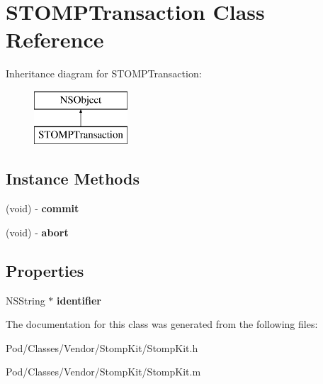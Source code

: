 \hypertarget{interface_s_t_o_m_p_transaction}{}\section{S\+T\+O\+M\+P\+Transaction Class Reference}
\label{interface_s_t_o_m_p_transaction}
Inheritance diagram for S\+T\+O\+M\+P\+Transaction\+:\begin{figure}[H]
\begin{center}
\leavevmode
\includegraphics[height=2.000000cm]{interface_s_t_o_m_p_transaction}
\end{center}
\end{figure}
\subsection*{Instance Methods}
\begin{DoxyCompactItemize}
\item 
(void) -\/ {\bfseries commit}\hypertarget{interface_s_t_o_m_p_transaction_af8bf085f7fa43b16c21efb34211fb363}{}\label{interface_s_t_o_m_p_transaction_af8bf085f7fa43b16c21efb34211fb363}

\item 
(void) -\/ {\bfseries abort}\hypertarget{interface_s_t_o_m_p_transaction_ac97d52094bd1649a42991132b070a6a0}{}\label{interface_s_t_o_m_p_transaction_ac97d52094bd1649a42991132b070a6a0}

\end{DoxyCompactItemize}
\subsection*{Properties}
\begin{DoxyCompactItemize}
\item 
N\+S\+String $\ast$ {\bfseries identifier}\hypertarget{interface_s_t_o_m_p_transaction_a21fac10a517ee5131e5ba5a6635b2fc8}{}\label{interface_s_t_o_m_p_transaction_a21fac10a517ee5131e5ba5a6635b2fc8}

\end{DoxyCompactItemize}


The documentation for this class was generated from the following files\+:\begin{DoxyCompactItemize}
\item 
Pod/\+Classes/\+Vendor/\+Stomp\+Kit/Stomp\+Kit.\+h\item 
Pod/\+Classes/\+Vendor/\+Stomp\+Kit/Stomp\+Kit.\+m\end{DoxyCompactItemize}
